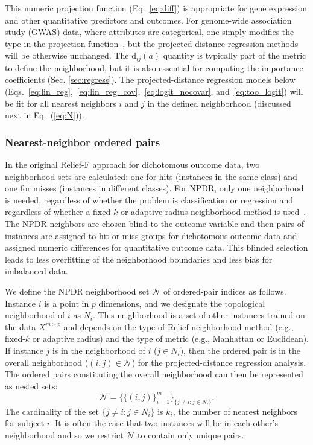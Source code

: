\documentclass[10pt]{article}
\begin{document}
This numeric projection function (Eq.~\ref{eq:diff}) is appropriate for gene expression and other quantitative predictors and outcomes.
For genome-wide association study (GWAS) data, where attributes are categorical, one simply modifies the type in the projection function~\cite{titv}, but the projected-distance regression methods will be otherwise unchanged.
The $\text{d}_{ij}(a)$ quantity is typically part of the metric to define the neighborhood, but it is also essential for computing the importance coefficients (Sec. \ref{sec:regress}).
The projected-distance regression models below (Eqs.~\ref{eq:lin_reg},~\ref{eq:lin_reg_cov},~\ref{eq:logit_nocovar}, and~\ref{eq:too_logit}) will be fit for all nearest neighbors $i$ and $j$ in the defined neighborhood (discussed next in Eq.~(\ref{eq:N})).

\subsubsection{Nearest-neighbor ordered pairs}
In the original Relief-F approach for dichotomous outcome data, two neighborhood sets are calculated: one for hits (instances in the same class) and one for misses (instances in different classes).
For NPDR, only one neighborhood is needed, regardless of whether the problem is classification or regression and regardless of whether a fixed-$k$ or adaptive radius neighborhood method is used~\cite{greene09,urbanowicz17,mckinney13}.
The NPDR neighbors are chosen blind to the outcome variable and then pairs of instances are assigned to hit or miss groups for dichotomous outcome data and assigned numeric differences for quantitative outcome data.
This blinded selection leads to less overfitting of the neighborhood boundaries and less bias for imbalanced data.

We define the NPDR neighborhood set $\mathcal{N}$ of ordered-pair indices as follows.
Instance $i$ is a point in $p$ dimensions, and we designate the topological neighborhood of $i$ as $N_{i}$.
This neighborhood is a set of other instances trained on the data $X^{m \times p}$ and depends on the type of Relief neighborhood method (e.g., fixed-$k$ or adaptive radius) and the type of metric (e.g., Manhattan or Euclidean).
If instance $j$ is in the neighborhood of $i$ ($j \in N_{i}$), then the ordered pair is in the overall neighborhood ($(i,j) \in \mathcal{N}$) for the projected-distance regression analysis.
The ordered pairs constituting the overall neighborhood can then be represented as nested sets:
\begin{equation}\label{eq:N}
\mathcal{N}=\{\{(i, j)\}_{i=1}^{m}\}_{\{j \ne i : j \in N_{i}\}}.
\end{equation}
The cardinality of the set $\{j \ne i : j \in N_{i}\}$ is $k_i$, the number of nearest neighbors for subject $i$.
It is often the case that two instances will be in each other's neighborhood and so we restrict $\mathcal{N}$ to contain only unique pairs.
\end{document}
